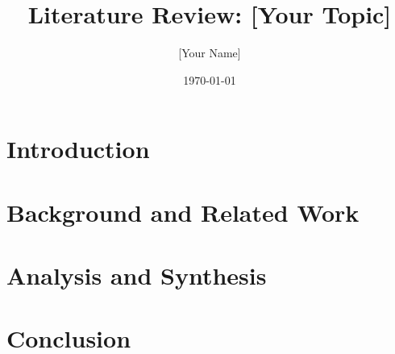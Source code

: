 \documentclass[12pt, a4paper]{article}
\title{Literature Review: [Your Topic]}
\author{[Your Name]}
\date{\today}
\begin{document}
\maketitle

\section{Introduction}

\section{Background and Related Work}

\section{Analysis and Synthesis}

\section{Conclusion}


\end{document}
